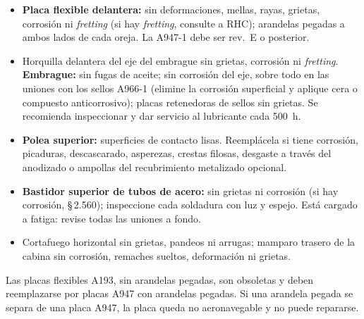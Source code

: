 \begin{itemize}
\item \textbf{Placa flexible delantera:} sin deformaciones, mellas, rayas, grietas, corrosión ni \emph{fretting} (si hay \emph{fretting}, consulte a RHC); arandelas pegadas a ambos lados de cada oreja. La A947-1 debe ser rev.~E o posterior.
\item Horquilla delantera del eje del embrague sin grietas, corrosión ni \emph{fretting}. \textbf{Embrague:} sin fugas de aceite; sin corrosión del eje, sobre todo en las uniones con los sellos A966-1 (elimine la corrosión superficial y aplique cera o compuesto anticorrosivo); placas retenedoras de sellos sin grietas. Se recomienda inspeccionar y dar servicio al lubricante cada 500~h.
\item \textbf{Polea superior:} superficies de contacto lisas. Reemplácela si tiene corrosión, picaduras, descascarado, asperezas, crestas filosas, desgaste a través del anodizado o ampollas del recubrimiento metalizado opcional.
\item \textbf{Bastidor superior de tubos de acero:} sin grietas ni corrosión (si hay corrosión, \S\,2.560); inspeccione cada soldadura con luz y espejo. Está cargado a fatiga: revise todas las uniones a fondo.
\item Cortafuego horizontal sin grietas, pandeos ni arrugas; mamparo trasero de la cabina sin corrosión, remaches sueltos, deformación ni grietas.
\end{itemize}

\begin{advertencia}
Las placas flexibles A193, sin arandelas pegadas, son obsoletas y deben reemplazarse por placas A947 con arandelas pegadas. Si una arandela pegada se separa de una placa A947, la placa queda no aeronavegable y no puede repararse.
\end{advertencia}

